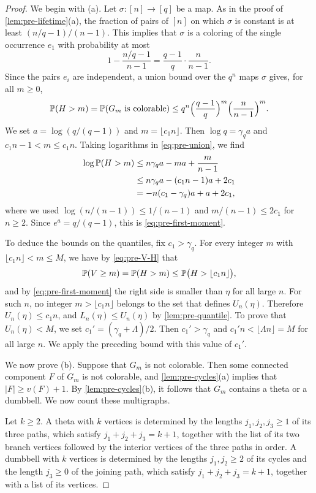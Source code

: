 \begin{proof}
We begin with (a). Let $\sigma \colon [n] \to [q]$ be a map. As in the proof of \cref{lem:pre-lifetime}(a), the fraction of pairs of $[n]$ on which $\sigma$ is constant is at least $(n/q - 1)/(n - 1)$. This implies that $\sigma$ is a coloring of the single occurrence $e_1$ with probability at most
\[
1 - \frac{n/q - 1}{n - 1} = \frac{q - 1}{q} \cdot \frac{n}{n - 1}.
\]
Since the pairs $e_i$ are independent, a union bound over the $q^n$ maps $\sigma$ gives, for all $m \ge 0$,
\begin{equation}\label{eq:pre-union}
\mathbb P(H > m) = \mathbb P(G_m \text{ is colorable}) \le q^n \Big(\frac{q - 1}{q}\Big)^m \Big(\frac{n}{n - 1}\Big)^m.
\end{equation}
We set $a = \log(q/(q - 1))$ and $m = \lfloor c_1 n\rfloor$. Then $\log q = \gamma_q a$ and $c_1 n - 1 < m \le c_1 n$. Taking logarithms in \eqref{eq:pre-union}, we find
\[
\begin{aligned}
\log \mathbb P(H > m) &\le n \gamma_q a - m a + \frac{m}{n - 1} \\
&\le n \gamma_q a - (c_1 n - 1) a + 2c_1 \\
&= -n (c_1 - \gamma_q) a + a + 2c_1,
\end{aligned}
\]
where we used $\log(n/(n - 1)) \le 1/(n - 1)$ and $m/(n - 1) \le 2c_1$ for $n \ge 2$. Since $e^{a} = q/(q - 1)$, this is \eqref{eq:pre-first-moment}.

To deduce the bounds on the quantiles, fix $c_1 > \gamma_q$. For every integer $m$ with $\lfloor c_1 n \rfloor < m \le M$, we have by \eqref{eq:pre-V-H} that
\[
\mathbb P(V \ge m) = \mathbb P(H > m) \le \mathbb P\big(H > \lfloor c_1 n \rfloor\big),
\]
and by \eqref{eq:pre-first-moment} the right side is smaller than $\eta$ for all large $n$. For such $n$, no integer $m > \lfloor c_1 n \rfloor$ belongs to the set that defines $U_n(\eta)$. Therefore $U_n(\eta) \le c_1 n$, and $L_n(\eta) \le U_n(\eta)$ by \cref{lem:pre-quantile}. To prove that $U_n(\eta) < M$, we set $c_1' = (\gamma_q + \Lambda)/2$. Then $c_1' > \gamma_q$ and $c_1' n < \lfloor\Lambda n\rfloor = M$ for all large $n$. We apply the preceding bound with this value of $c_1'$.

We now prove (b). Suppose that $G_m$ is not colorable. Then some connected component $F$ of $G_m$ is not colorable, and \cref{lem:pre-cycles}(a) implies that $|F| \ge v(F) + 1$. By \cref{lem:pre-cycles}(b), it follows that $G_m$ contains a theta or a dumbbell. We now count these multigraphs.

Let $k \ge 2$. A theta with $k$ vertices is determined by the lengths $j_1, j_2, j_3 \ge 1$ of its three paths, which satisfy $j_1 + j_2 + j_3 = k + 1$, together with the list of its two branch vertices followed by the interior vertices of the three paths in order. A dumbbell with $k$ vertices is determined by the lengths $j_1, j_2 \ge 2$ of its cycles and the length $j_3 \ge 0$ of the joining path, which satisfy $j_1 + j_2 + j_3 = k + 1$, together with a list of its vertices.


\end{proof}
